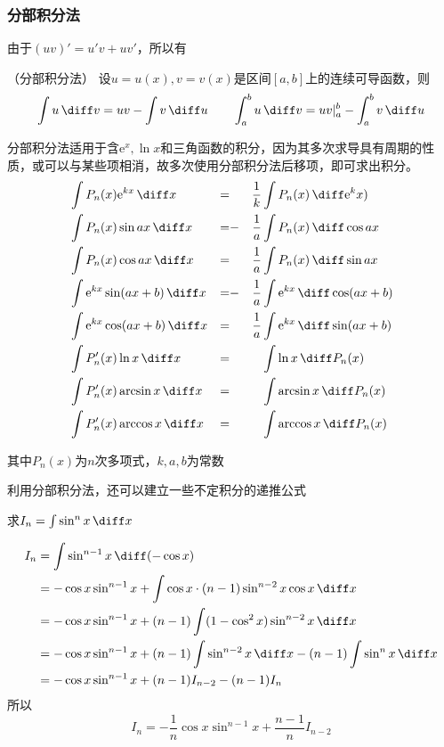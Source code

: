 \subsubsection{分部积分法}
由于$(uv)'=u'v+uv'$，所以有
\begin{theorem}
    （分部积分法）
    设$u=u(x),v=v(x)$是区间$[a,b]$上的连续可导函数，则
    \[ \int u\,\diff v = uv - \int v\,\diff u \qquad \int_a^b u\,\diff v = uv\vert_a^b - \int_a^bv\,\diff u \]
\end{theorem}
\begin{situation}
    分部积分法适用于含$\mathrm{e}^x,\ln x$和三角函数的积分，因为其多次求导具有周期的性质，或可以与某些项相消，故多次使用分部积分法后移项，即可求出积分。
    \begin{alignat*}{43}
         & \int P_n(x)\mathrm{e}^{kx}\,\diff x\    & = &   & \frac{1}{k} & \int P_n(x)\,\diff \mathrm{e}^kx)      \\
         & \int P_n(x)\sin ax\,\diff x\            & = & - & \frac{1}{a} & \int P_n(x)\,\diff \cos ax             \\
         & \int P_n(x)\cos ax\,\diff x \           & = &   & \frac{1}{a} & \int P_n(x)\,\diff \sin ax             \\
         & \int \mathrm{e}^{kx}\sin(ax+b)\,\diff x & = & - & \frac{1}{a} & \int \mathrm{e}^{kx}\,\diff \cos(ax+b) \\
         & \int \mathrm{e}^{kx}\cos(ax+b)\,\diff x & = &   & \frac{1}{a} & \int \mathrm{e}^{kx}\,\diff \sin(ax+b) \\
         & \int P_n'(x)\ln x\,\diff x              & = &   &             & \int \ln x\,\diff P_n(x)               \\
         & \int P_n'(x)\arcsin x\,\diff x          & = &   &             & \int \arcsin x\,\diff P_n(x)           \\
         & \int P_n'(x)\arccos x\,\diff x          & = &   &             & \int \arccos x\,\diff P_n(x)
    \end{alignat*}

    其中$P_n(x)$为$n$次多项式，$k,a,b$为常数
\end{situation}
利用分部积分法，还可以建立一些不定积分的递推公式
\begin{example}
    求$I_n=\int \sin^n x\,\diff x$
\end{example}
\begin{solution}
    \begin{align*}
        I_n & = \int \sin^{n-1} x\,\diff(-\cos x)                                               \\
            & = -\cos x\sin^{n-1}x + \int \cos x\cdot(n-1)\sin^{n-2}x\cos x\,\diff x            \\
            & = -\cos x\sin^{n-1}x + (n-1)\int (1-\cos^2 x)\sin^{n-2}x\,\diff x                 \\
            & = -\cos x\sin^{n-1}x + (n-1)\int \sin^{n-2}x\,\diff x - (n-1)\int\sin^nx\,\diff x \\
            & = -\cos x\sin^{n-1}x + (n-1)I_{n-2} - (n-1)I_n
    \end{align*}
    所以
    \[ I_n = -\frac{1}{n}\cos x\sin^{n-1}x + \frac{n-1}{n}I_{n-2} \]
\end{solution}

